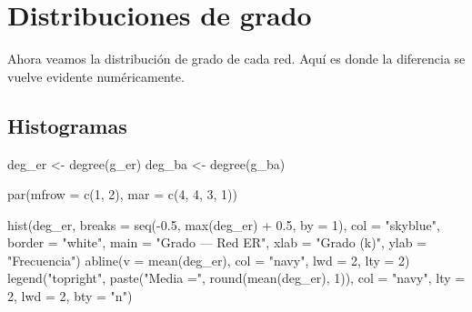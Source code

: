\documentclass[
  letterpaper,
  DIV=11,
  numbers=noendperiod]{scrreprt}
\newenvironment{Shaded}{\begin{snugshade}}{\end{snugshade}}
\newcommand{\AttributeTok}[1]{\textcolor[rgb]{0.40,0.45,0.13}{#1}}
\newcommand{\DecValTok}[1]{\textcolor[rgb]{0.68,0.00,0.00}{#1}}
\newcommand{\FloatTok}[1]{\textcolor[rgb]{0.68,0.00,0.00}{#1}}
\newcommand{\FunctionTok}[1]{\textcolor[rgb]{0.28,0.35,0.67}{#1}}
\newcommand{\NormalTok}[1]{\textcolor[rgb]{0.00,0.23,0.31}{#1}}
\newcommand{\OtherTok}[1]{\textcolor[rgb]{0.00,0.23,0.31}{#1}}
\newcommand{\SpecialCharTok}[1]{\textcolor[rgb]{0.37,0.37,0.37}{#1}}
\newcommand{\StringTok}[1]{\textcolor[rgb]{0.13,0.47,0.30}{#1}}
\begin{document}
\section{Distribuciones de grado}\label{distribuciones-de-grado}

Ahora veamos la distribución de grado de cada red. Aquí es donde la
diferencia se vuelve evidente numéricamente.

\subsection{Histogramas}\label{histogramas}

\begin{Shaded}
\begin{Highlighting}[]
\NormalTok{deg\_er }\OtherTok{\textless{}{-}} \FunctionTok{degree}\NormalTok{(g\_er)}
\NormalTok{deg\_ba }\OtherTok{\textless{}{-}} \FunctionTok{degree}\NormalTok{(g\_ba)}

\FunctionTok{par}\NormalTok{(}\AttributeTok{mfrow =} \FunctionTok{c}\NormalTok{(}\DecValTok{1}\NormalTok{, }\DecValTok{2}\NormalTok{), }\AttributeTok{mar =} \FunctionTok{c}\NormalTok{(}\DecValTok{4}\NormalTok{, }\DecValTok{4}\NormalTok{, }\DecValTok{3}\NormalTok{, }\DecValTok{1}\NormalTok{))}

\FunctionTok{hist}\NormalTok{(deg\_er, }
     \AttributeTok{breaks =} \FunctionTok{seq}\NormalTok{(}\SpecialCharTok{{-}}\FloatTok{0.5}\NormalTok{, }\FunctionTok{max}\NormalTok{(deg\_er) }\SpecialCharTok{+} \FloatTok{0.5}\NormalTok{, }\AttributeTok{by =} \DecValTok{1}\NormalTok{),}
     \AttributeTok{col =} \StringTok{"skyblue"}\NormalTok{, }\AttributeTok{border =} \StringTok{"white"}\NormalTok{,}
     \AttributeTok{main =} \StringTok{"Grado — Red ER"}\NormalTok{,}
     \AttributeTok{xlab =} \StringTok{"Grado (k)"}\NormalTok{, }\AttributeTok{ylab =} \StringTok{"Frecuencia"}\NormalTok{)}
\FunctionTok{abline}\NormalTok{(}\AttributeTok{v =} \FunctionTok{mean}\NormalTok{(deg\_er), }\AttributeTok{col =} \StringTok{"navy"}\NormalTok{, }\AttributeTok{lwd =} \DecValTok{2}\NormalTok{, }\AttributeTok{lty =} \DecValTok{2}\NormalTok{)}
\FunctionTok{legend}\NormalTok{(}\StringTok{"topright"}\NormalTok{, }\FunctionTok{paste}\NormalTok{(}\StringTok{"Media ="}\NormalTok{, }\FunctionTok{round}\NormalTok{(}\FunctionTok{mean}\NormalTok{(deg\_er), }\DecValTok{1}\NormalTok{)), }
       \AttributeTok{col =} \StringTok{"navy"}\NormalTok{, }\AttributeTok{lty =} \DecValTok{2}\NormalTok{, }\AttributeTok{lwd =} \DecValTok{2}\NormalTok{, }\AttributeTok{bty =} \StringTok{"n"}\NormalTok{)}


\end{Highlighting}
\end{Shaded}
\end{document}
